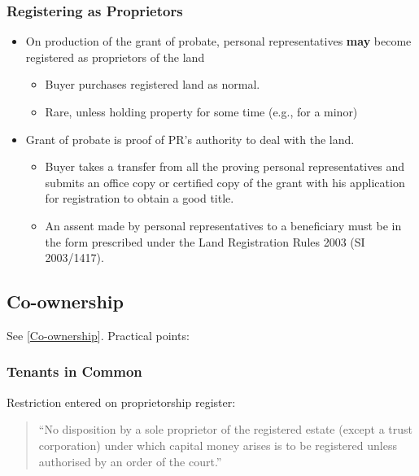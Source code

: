 \documentclass[
]{article}
\providecommand{\tightlist}{%
  \setlength{\itemsep}{0pt}\setlength{\parskip}{0pt}}
\begin{document}
\hypertarget{registering-as-proprietors}{%
\subsubsection{Registering as
Proprietors}\label{registering-as-proprietors}}

\begin{itemize}
\tightlist
\item
  On production of the grant of probate, personal representatives
  \textbf{may} become registered as proprietors of the land

  \begin{itemize}
  \tightlist
  \item
    Buyer purchases registered land as normal.
  \item
    Rare, unless holding property for some time (e.g., for a minor)
  \end{itemize}
\item
  Grant of probate is proof of PR's authority to deal with the land.

  \begin{itemize}
  \tightlist
  \item
    Buyer takes a transfer from all the proving personal representatives
    and submits an office copy or certified copy of the grant with his
    application for registration to obtain a good title.
  \item
    An assent made by personal representatives to a beneficiary must be
    in the form prescribed under the Land Registration Rules 2003 (SI
    2003/1417).
  \end{itemize}
\end{itemize}

\hypertarget{co-ownership}{%
\subsection{Co-ownership}\label{co-ownership}}

See {[}\protect\hyperlink{co-ownership}{Co-ownership}{]}. Practical
points:

\hypertarget{tenants-in-common}{%
\subsubsection{Tenants in Common}\label{tenants-in-common}}

Restriction entered on proprietorship register:

\begin{quote}
``No disposition by a sole proprietor of the registered estate (except a
trust corporation) under which capital money arises is to be registered
unless authorised by an order of the court.''
\end{quote}
\end{document}
